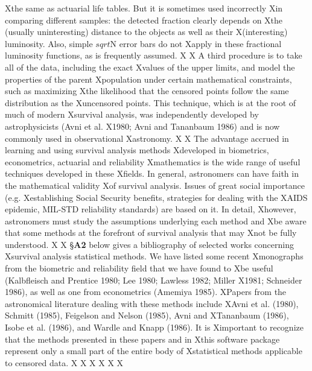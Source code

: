 Xthe same as actuarial life tables.  But it is sometimes used incorrectly 
Xin comparing different samples:  the detected fraction clearly depends on 
Xthe (usually uninteresting) distance to the objects as well as their
X(interesting)  luminosity.  Also, simple $sqrt$N error bars do not
Xapply in these fractional luminosity functions, as is frequently assumed. 
X 
X     A third procedure is to take all of the data, including the exact
Xvalues of the upper limits, and model the properties of   the parent
Xpopulation under certain mathematical constraints, such as maximizing 
Xthe likelihood that the censored points follow the same distribution as the
Xuncensored points.  This technique, which is at the root of much of modern 
Xsurvival analysis, was independently developed by astrophysicists (Avni et al.
X1980; Avni and Tananbaum 1986) and is now commonly used in observational
Xastronomy. 
X
X     The advantage accrued in learning and using survival analysis methods 
Xdeveloped in biometrics, econometrics, actuarial and reliability
Xmathematics is the wide range of useful techniques developed in these 
Xfields. In general, astronomers can have faith in the mathematical validity
Xof survival analysis.  Issues of great social importance (e.g.
Xestablishing Social Security benefits, strategies for dealing with the 
XAIDS epidemic, MIL-STD reliability standards) are based on it. In detail,
Xhowever, astronomers must study the assumptions underlying each method and
Xbe aware that some methods at the  forefront of survival analysis that may 
Xnot be fully understood.
X 
X     \S {\bf A2} below gives a bibliography of selected works concerning 
Xsurvival analysis statistical methods.  We have listed some  recent
Xmonographs from the biometric and reliability field that we have found to
Xbe useful (Kalbfleisch and Prentice 1980; Lee 1980;  Lawless 1982; Miller
X1981; Schneider 1986), as well as one from econometrics (Amemiya 1985). 
XPapers from the astronomical literature dealing with these methods include
XAvni et al. (1980), Schmitt (1985), Feigelson and Nelson (1985), Avni and 
XTananbaum (1986), Isobe et al. (1986), and Wardle and Knapp (1986).  It is
Ximportant to recognize that the methods presented in these papers and in 
Xthis software package represent only a small part of the entire body of 
Xstatistical methods applicable to censored data.
X
X
X\bigskip
X\bigskip
X
X
